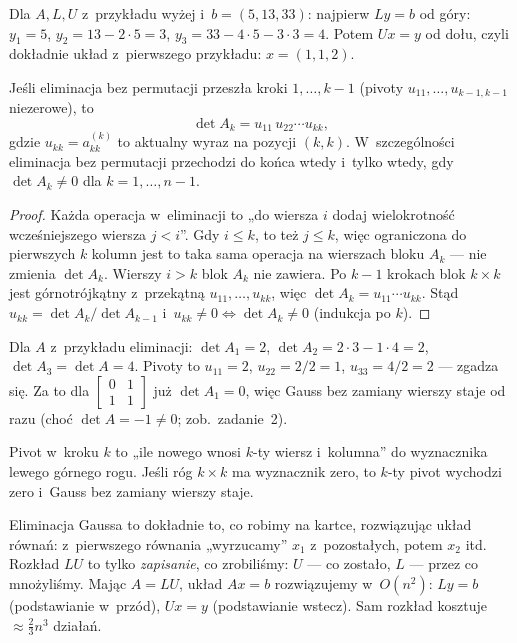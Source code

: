 \documentclass[11pt]{article}
\begin{document}
\begin{przyklad}
Dla $A,L,U$ z~przykładu wyżej i~$b=(5,13,33)$: najpierw $Ly=b$ od góry:
$y_1=5$, $y_2=13-2\cdot5=3$, $y_3=33-4\cdot5-3\cdot3=4$. Potem $Ux=y$ od
dołu, czyli dokładnie układ z~pierwszego przykładu: $x=(1,1,2)$.
\end{przyklad}

\begin{lemat}\label{lem:minory}
Jeśli eliminacja bez permutacji przeszła kroki $1,\ldots,k-1$ (pivoty
$u_{11},\ldots,u_{k-1,k-1}$ niezerowe), to
\[
\det A_k=u_{11}\,u_{22}\cdots u_{kk},
\]
gdzie $u_{kk}=a^{(k)}_{kk}$ to aktualny wyraz na pozycji $(k,k)$.
W~szczególności eliminacja bez permutacji przechodzi do końca wtedy
i~tylko wtedy, gdy $\det A_k\ne0$ dla $k=1,\ldots,n-1$.
\end{lemat}

\begin{proof}
Każda operacja w~eliminacji to „do wiersza $i$ dodaj wielokrotność
wcześniejszego wiersza $j<i$”. Gdy $i\le k$, to też $j\le k$, więc
ograniczona do pierwszych $k$ kolumn jest to taka sama operacja na
wierszach bloku $A_k$ --- nie zmienia $\det A_k$. Wierszy $i>k$ blok $A_k$
nie zawiera. Po $k-1$ krokach blok $k\times k$ jest górnotrójkątny
z~przekątną $u_{11},\ldots,u_{kk}$, więc $\det A_k=u_{11}\cdots u_{kk}$.
Stąd $u_{kk}=\det A_k/\det A_{k-1}$ i~$u_{kk}\ne0\iff\det A_k\ne0$
(indukcja po $k$).
\end{proof}

\begin{przyklad}
Dla $A$ z~przykładu eliminacji: $\det A_1=2$, $\det A_2=2\cdot3-1\cdot4=2$,
$\det A_3=\det A=4$. Pivoty to $u_{11}=2$, $u_{22}=2/2=1$,
$u_{33}=4/2=2$ --- zgadza się. Za to dla
$\left[\begin{smallmatrix}0&1\\1&1\end{smallmatrix}\right]$ już
$\det A_1=0$, więc Gauss bez zamiany wierszy staje od razu
(choć $\det A=-1\ne0$; zob.\ zadanie~2).
\end{przyklad}

\begin{poludzku}
Pivot w~kroku $k$ to „ile nowego wnosi $k$-ty wiersz i~kolumna” do
wyznacznika lewego górnego rogu. Jeśli róg $k\times k$ ma wyznacznik
zero, to $k$-ty pivot wychodzi zero i~Gauss bez zamiany wierszy staje.
\end{poludzku}

\begin{intuicja}
Eliminacja Gaussa to dokładnie to, co robimy na kartce, rozwiązując
układ równań: z~pierwszego równania „wyrzucamy” $x_1$ z~pozostałych,
potem $x_2$ itd. Rozkład $LU$ to tylko \emph{zapisanie}, co zrobiliśmy:
$U$ --- co zostało, $L$ --- przez co mnożyliśmy. Mając $A=LU$, układ
$Ax=b$ rozwiązujemy w~$O(n^2)$: $Ly=b$ (podstawianie w~przód), $Ux=y$
(podstawianie wstecz). Sam rozkład kosztuje $\approx\tfrac23n^3$ działań.
\end{intuicja}
\end{document}
